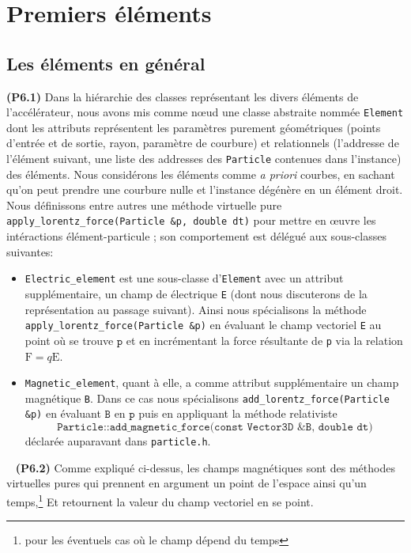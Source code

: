 \documentclass[12pt, letterpaper, twoside]{article}
\newcommand{\T}[1]{\texttt{#1}}
\begin{document}
\section{Premiers éléments}

\subsection{Les éléments en général}
\noindent \textbf{(P6.1)} Dans la hiérarchie des classes représentant les divers éléments de l'accélérateur, nous avons mis comme nœud une classe abstraite nommée \T{Element} dont les attributs représentent les paramètres purement géométriques (points d'entrée et de sortie, rayon, paramètre de courbure) et relationnels (l'addresse de l'élément suivant, une liste des addresses des \T{Particle} contenues dans l'instance) des éléments. Nous considérons les éléments comme \textit{a priori} courbes, en sachant qu'on peut prendre une courbure nulle et l'instance dégénère en un élément droit. Nous définissons entre autres une méthode virtuelle pure \T{apply\_lorentz\_force(Particle \&p, double dt)} pour mettre en œuvre les intéractions élément-particule ; son comportement est délégué aux sous-classes suivantes:

\begin{itemize}
\item \T{Electric\_element} est une sous-classe d'\T{Element} avec un attribut supplémentaire, un champ de électrique \T{E} (dont nous discuterons de la représentation au passage suivant). Ainsi nous spécialisons la méthode \T{apply\_lorentz\_force(Particle \&p)} en évaluant le champ vectoriel \T{E} au point où se trouve $\T{p}$ et en incrémentant la force résultante de \T{p} via la relation $\boldsymbol{\mathrm{F}}=q\boldsymbol{\mathrm{E}}$.

\item \T{Magnetic\_element}, quant à elle, a comme attribut supplémentaire un champ magnétique \T{B}. Dans ce cas nous spécialisons \T{add\_lorentz\_force(Particle \&p)} en évaluant $\T{B}$ en $\T{p}$ puis en appliquant la méthode relativiste $$\T{Particle::add\_magnetic\_force(const Vector3D \&B, double dt)}$$ déclarée auparavant dans \T{particle.h}.

\end{itemize}

\ \linebreak
\textbf{(P6.2)} Comme expliqué ci-dessus, les champs magnétiques sont des méthodes virtuelles pures qui prennent en argument un point de l'espace ainsi qu'un temps,\footnote{pour les éventuels cas où le champ dépend du temps} Et retournent la valeur du champ vectoriel en se point.
\end{document}
